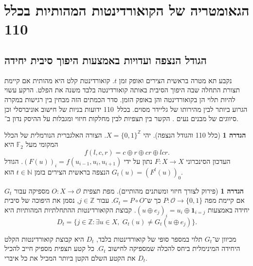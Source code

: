 \documentclass[11pt,a4paper]{article}
\theoremstyle{definition}
\newtheorem{definition}[theorem]{הגדרה}
\begin{document}
\section{הגאומטריה של הקואורדינטות המהותיות בכלל 110}\label{sec:geometry}
\subsection{הגודל הנצפה ועדויות באמצעות היפוך סיבית יחידה}
נקבע תא מטרה בראשית הצירים ואופק זמן $t$. קואורדינטת קלט היא מהותית אם קיימת תצורת התחלה שבה היפוך הסיבית באותה קואורדינטה בלבד משנה את הפלט. הרקע עשוי להיות תלוי הן בקואורדינטה והן באופק הזמן. סדר הכמתים הזה מבחין בין רגישות במקרה הגרוע ביותר לבין מהירותו של גליידר מסוים. בכלל~110 ידועות בניות של חישוב אוניברסלי \cite{cook2004} וכן סיווגים של מבנים נעים \cite{wolfram1986,martinez2006}. הקשר בין תצפיות לבין מחלקות חיזוי ומגבלות על ההיסק נדון ב־\cite{shalizi2001,wolpert2008}.

\begin{definition}[כלל 110 והגודל הנצפה]
יהי $X = \{0, 1\}^{\mathbb{Z}}$. הצורה האלגברית הנורמלית של הכלל המקומי מעל $\mathbb{F}_2$ היא
\begin{equation}\label{eq:rule110}
f(l, c, r) = c \oplus r \oplus cr \oplus lcr.
\end{equation}
העדכון הסינכרוני $F : X \to X$ נתון על ידי $(F(u))_i = f(u_{i-1}, u_i, u_{i+1})$. הגודל הנצפה בראשית הצירים בזמן $t \in \mathbb{N}$ הוא $G_t(u) = (F^t(u))_0$.
\end{definition}

\begin{definition}[פירוק לצורך חיזוי ומשתנים מהותיים]
מפת תצפית $O : X \to \mathcal{O}$ מספיקה עבור $G_t$ אם קיימת מפה $P : \mathcal{O} \to \{0, 1\}$ כך ש־$G_t = P \circ O$. עבור $j \in \mathbb{Z}$, נסמן את היפוכה של סיבית יחידה באמצעות $(u \oplus e_j)_i = u_i \oplus \mathbf{1}_{i=j}$. קבוצת הקואורדינטות ההתחלתיות המהותיות היא
\begin{equation}\label{eq:essential_set}
D_t = \{ j \in \mathbb{Z} : \exists u \in X,\; G_t(u) \ne G_t(u \oplus e_j) \}.
\end{equation}
\end{definition}

מכיוון ש־$G_t$ תלוי במספר סופי של קואורדינטות בלבד, $D_t$ היא קבוצת קואורדינטות הקלט היחידה המינימלית ביחס להכלה שמספיקה לחישוב $G_t$. כל קטע תצפית מספיק חייב להכיל את הקטע השלם הקטן ביותר המכיל את כל איברי $D_t$.
\end{document}
